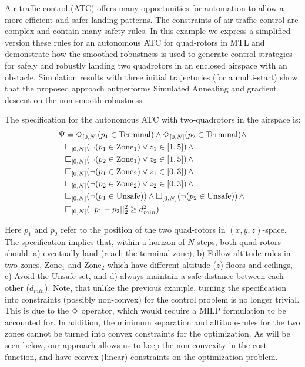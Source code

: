 
Air traffic control (ATC) offers many opportunities for automation to allow a more efficient and safer landing patterns. The constraints of air traffic control are complex and contain many safety rules. In this example we express a simplified version these rules for an autonomous ATC for quad-rotors in MTL and demonstrate how the smoothed robustness is used to generate control strategies for safely and robustly landing two quadrotors in an enclosed airspace with an obstacle. Simulation results with three initial trajectories (for a multi-start) show that the proposed approach outperforms Simulated Annealing and gradient descent on the non-smooth robustness.

The specification for the autonomous ATC with two-quadrotors in the airspace is:
{\small
\begin{subequations}
\begin{align}
\Psi &= \Diamond_{[0,N]}(p_1 \in \text{Terminal}) \wedge \Diamond_{[0,N]}(p_2 \in \text{Terminal}) \wedge   \nonumber \\
& \square_{[0,N]} (\neg (p_1 \in \text{Zone}_1) \vee z_1 \in [1,5]) \, \wedge \nonumber \\
& \square_{[0,N]} (\neg (p_2 \in \text{Zone}_1) \vee z_2 \in [1,5]) \, \wedge \nonumber \\
& \square_{[0,N]} (\neg (p_1 \in \text{Zone}_2) \vee z_1 \in [0,3]) \, \wedge \nonumber \\
& \square_{[0,N]} (\neg (p_2 \in \text{Zone}_2) \vee z_2 \in [0,3]) \, \wedge \nonumber \\
& \square_{[0,N]} (\neg (p_1 \in \text{Unsafe})) \wedge \square_{[0,N]} (\neg (p_2 \in \text{Unsafe})) \, \wedge  \nonumber \\
& \square_{[0,N]} (||p_1-p_2||_2^2 \geq d_{min}^2)
\end{align}
\end{subequations}
}

Here $p_1$ and $p_2$ refer to the position of the two quad-rotors in $(x,y,z)$-space. The specification implies that, within a horizon of $N$ steps,  both quad-rotors should: a) eventually land (reach the terminal zone), b) Follow altitude rules in two zones, $\text{Zone}_1$ and $\text{Zone}_2$ which have different altitude ($z$) floors and ceilings, c) Avoid the $\text{Unsafe}$ set, and d) always maintain a safe distance between each other ($d_{min}$). Note, that unlike the previous example, turning the specification into constraints (possibly non-convex) for the control problem is no longer trivial. This is due to the $\Diamond$ operator, which would require a MILP formulation to be accounted for. In addition, the minimum separation and altitude-rules for the two zones cannot be turned into convex constraints for the optimization. As will be seen below, our approach allows us to keep the non-convexity in the cost function, and have convex (linear) constraints on the optimization problem.

